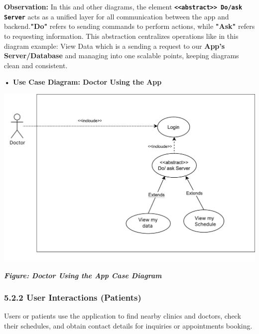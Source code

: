 \documentclass[12pt]{report}
\begin{document}
\vspace{0.5cm}

\noindent \textbf{Observation:} In this and other diagrams, the element \textbf{ \texttt{<<abstract>> Do/ask Server}} acts as a unified layer for all communication between the app and backend.\textbf{"Do"} refers to sending commands to perform actions, while \textbf{"Ask"} refers to requesting information. This abstraction centralizes operations like in this diagram example: View Data which is a sending a request to our \textbf{App's Server/Database} and managing into one scalable points, keeping diagrams clean and consistent.



\vspace{0.5cm}
\noindent \textbf{• Use Case Diagram: Doctor Using the App}
\vspace{0.6cm}
\begin{center}
	\includegraphics[width=\textwidth]{images/doctorCAS.pdf}
\end{center}
\vspace{-0.85cm}
\begin{center}
	\textit{\textbf{Figure: Doctor Using the App Case Diagram}}
\end{center}

\newpage
\subsubsection*{\textbf{5.2.2 User Interactions (Patients)}}
Users or patients use the application to find nearby clinics and doctors, check their schedules, and obtain contact details for inquiries or appointments booking.
\end{document}
